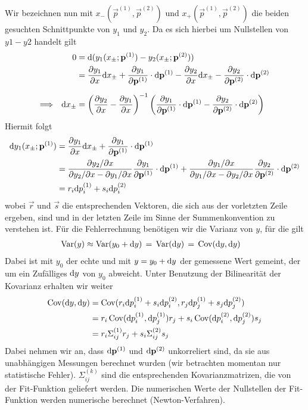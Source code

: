 Wir bezeichnen nun mit $x_{-}(\vec{p}^{(1)}, \vec{p}^{(2)})$ und $x_{+}(\vec{p}^{(1)}, \vec{p}^{(2)})$ die beiden gesuchten Schnittpunkte von $y_1$ und $y_2$. Da es sich hierbei um Nullstellen von $y1 - y2$ handelt gilt
%
\begin{align*}
               && 0 &= \mathrm{d}(y_1(x_{\pm}; \mathbf{p}^{(1)}) - y_2(x_{\pm}; \mathbf{p}^{(2)})) \\
                 && &=  \frac{\partial y_1}{\partial x} \mathrm{d} x_{\pm} + \frac{\partial y_1}{\partial \mathbf{p}^{(1)}} \cdot \mathrm{d} \mathbf{p}^{(1)}
                      - \frac{\partial y_2}{\partial x} \mathrm{d} x_{\pm} - \frac{\partial y_2}{\partial \mathbf{p}^{(2)}} \cdot \mathrm{d} \mathbf{p}^{(2)} \\[2mm]
\Longrightarrow&& \mathrm{d} x_{\pm} &= \left(\frac{\partial y_2}{\partial x} - \frac{\partial y_1}{\partial x}\right)^{-1}
                                \left( \frac{\partial y_1}{\partial \mathbf{p}^{(1)}}\cdot \mathrm{d} \mathbf{p}^{(1)} - \frac{\partial y_2}{\partial \mathbf{p}^{(2)}} \cdot \mathrm{d} \mathbf{p}^{(2)} \right)
\end{align*}
%
Hiermit folgt
%
\begin{align*}
    \mathrm{d} y_1(x_{\pm}; \mathbf{p}^{(1)}) &= \frac{\partial y_1}{\partial x} \mathrm{d} x_{\pm} + \frac{\partial y_1}{\partial \mathbf{p}^{(1)}} \cdot \mathrm{d} \mathbf{p}^{(1)} \\
                                   &= \frac{\partial y_2 / \partial x}{\partial y_2 / \partial x - \partial y_1 / \partial x} \frac{\partial y_1}{\partial \mathbf{p}^{(1)}} \cdot \mathrm{d} \mathbf{p}^{(1)} + 
                                   \frac{\partial y_1 / \partial x}{\partial y_1 / \partial x - \partial y_2 / \partial x} \frac{\partial y_2}{\partial \mathbf{p}^{(2)}} \cdot \mathrm{d} \mathbf{p}^{(2)} \\
                                   &= r_i \mathrm{d} p^{(1)}_i + s_i \mathrm{d} p^{(2)}_i
\end{align*}
%
wobei $\vec{r}$ und $\vec{s}$ die entsprechenden Vektoren, die sich aus der vorletzten Zeile ergeben, sind und in der letzten Zeile im Sinne der Summenkonvention zu verstehen ist.
Für die Fehlerrechnung benötigen wir die Varianz von $y$, für die gilt
\begin{align*}
    \operatorname{Var}(y) &\approx \operatorname{Var}(y_0 + \mathrm{d} y) \,=\, \operatorname{Var}(\mathrm{d} y) \,=\, \operatorname{Cov}(\mathrm{d} y, \mathrm{d} y)
\end{align*}
Dabei ist mit $y_0$ der echte und mit $y = y_0 + \mathrm{d} y$ der gemessene Wert gemeint, der um ein Zufälliges $\mathrm{d} y$ von $y_0$ abweicht. Unter Benutzung der Bilinearität der Kovarianz erhalten wir weiter
%
\begin{align*}
\operatorname{Cov}(\mathrm{d} y, \mathrm{d} y) &= \operatorname{Cov}(r_i \mathrm{d} p^{(1)}_i + s_i \mathrm{d} p^{(2)}_i, r_j \mathrm{d} p^{(1)}_j + s_j \mathrm{d} p^{(2)}_j) \\
            &= r_i \operatorname{Cov}(\mathrm{d} p^{(1)}_i, \mathrm{d} p^{(1)}_j) r_j + s_i \operatorname{Cov}(\mathrm{d} p^{(2)}_i, \mathrm{d} p^{(2)}_j) s_j \\
            &= r_i \Sigma^{(1)}_{i j} r_j + s_i \Sigma^{(2)}_{i j} s_j
\end{align*}
%
Dabei nehmen wir an, dass $\mathrm{d} \mathbf{p}^{(1)}$ und $\mathrm{d} \mathbf{p}^{(2)}$ unkorreliert sind, da sie aus unabhängigen Messungen berechnet wurden (wir betrachten momentan nur statistische Fehler). $\Sigma^{(k)}_{i j}$ sind die entsprechenden Kovarianzmatrizen, die von der Fit-Funktion geliefert werden. Die numerischen Werte der Nullstellen der Fit-Funktion werden numerische berechnet (Newton-Verfahren).


